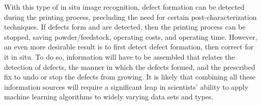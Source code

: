 With this type of in situ image recognition, defect formation can be detected during the printing process, precluding the need for certain post-characterization techniques. If defects form and are detected, then the printing process can be stopped, saving powder/feedstock, operating costs, and operating time. However, an even more desirable result is to first detect defect formation, then correct for it in situ. To do so, information will have to be assembled that relates the detection of defects, the manner in which the defects formed, and the prescribed fix to undo or stop the defects from growing. It is likely that combining all these information sources will require a significant leap in scientists' ability to apply machine learning algorithms to widely varying data sets and types. 